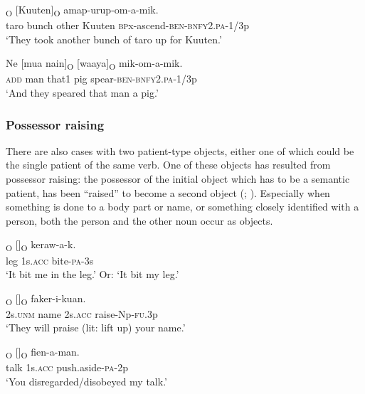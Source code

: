 \ea%
\label{ex:5:x947}
\textsubscript{O}  [Kuuten]\textsubscript{O}  amap-urup-om-a-mik. \\
     taro  bunch  other  Kuuten  \textsc{bp}x-ascend-\textsc{ben}-\textsc{bnfy}2.\textsc{pa}-1/3p \\
\glt `They took another bunch of taro up for Kuuten.'
\z

\ea%
\label{ex:5:x1840}
\gll Ne  [mua  nain]\textsubscript{O}  [waaya]\textsubscript{O}  mik-om-a-mik. \\
     \textsc{add}  man  that1  pig  spear-\textsc{ben}-\textsc{bnfy}2.\textsc{pa}-1/3p \\
\glt `And they speared that man a pig.'
\z

\subsubsection[Possessor raising]{Possessor raising} \label{sec:5.3.2.3}

There are also cases with two patient-type objects, either one of which could be the single patient of the same verb. One of these objects has resulted from possessor raising: the possessor of the initial object  which has to be a semantic patient, has been ``raised'' to become a second object (\citealt[258]{VanValinEtAl1997}; \citealt[194--196]{Payne1997}). Especially when something is done to a body part or name, or something closely identified with a person, both the person and the other noun occur as objects.

\ea%
\label{ex:5:x951}
\textsubscript{O} []\textsubscript{O}  keraw-a-k. \\
     leg  1s.\textsc{acc}  bite-\textsc{pa}-3s \\
\glt `It bit me in the leg.' Or: `It bit my leg.'
\z

\ea%
\label{ex:5:x952}
\textsubscript{O}  []\textsubscript{O}  faker-i-kuan. \\
     2s.\textsc{unm}  name  2s.\textsc{acc}  raise-Np-\textsc{fu}.3p \\
\glt `They will praise (lit: lift up) your name.'
\z

\ea%
\label{ex:5:x957}
\textsubscript{O}  []\textsubscript{O}  fien-a-man. \\
     talk  1s.\textsc{acc}  push.aside-\textsc{pa}-2p \\
\glt `You disregarded/disobeyed my talk.'
\z

